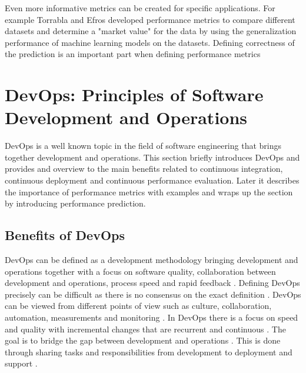 Even more informative metrics can be created for specific applications. For example Torrabla and Efros \parencite*{torralbaUnbiasedLookDataset2011} developed performance metrics to compare different datasets and determine a "market value" for the data by using the generalization performance of machine learning models on the datasets. Defining correctness of the prediction is an important part when defining performance metrics \parencite{linMicrosoftCOCOCommon2014}

\section{DevOps: Principles of Software Development and Operations}
\label{sec:devops}

DevOps is a well known topic in the field of software engineering that brings together development and operations. This section briefly introduces DevOps and provides and overview to the main benefits related to continuous integration, continuous deployment and continuous performance evaluation. Later it describes the importance of performance metrics with examples and wraps up the section by introducing performance prediction.

\subsection{Benefits of DevOps}

DevOps can be defined as a development methodology bringing development and operations together with a focus on software quality, collaboration between development and operations, process speed and rapid feedback \parencite{jabbariWhatDevOpsSystematic2016, mishraDevOpsSoftwareQuality2020,wallerIncludingPerformanceBenchmarks2015, pereraImproveSoftwareQuality2017}. Defining DevOps precisely can be difficult as there is no consensus on the exact definition \parencite{smedsDevOpsDefinitionPerceived2015,jabbariWhatDevOpsSystematic2016, mishraDevOpsSoftwareQuality2020}. DevOps can be viewed from different points of view such as culture, collaboration, automation, measurements and monitoring \parencite{mishraDevOpsSoftwareQuality2020, wallerIncludingPerformanceBenchmarks2015}. In DevOps there is a focus on speed and quality with incremental changes that are recurrent and continuous \parencite{mishraDevOpsSoftwareQuality2020}. The goal is to bridge the gap between development and operations \parencite{smedsDevOpsDefinitionPerceived2015}. This is done through sharing tasks and responsibilities from development to deployment and support \parencite{mishraDevOpsSoftwareQuality2020}.

